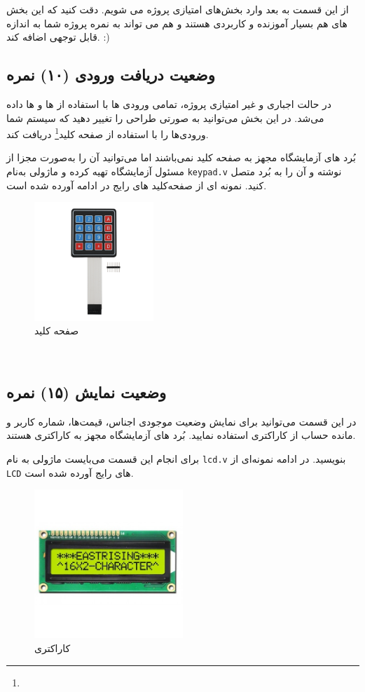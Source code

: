 \documentclass[]{article}
\begin{document}
از این قسمت به بعد وارد بخش‌های امتیازی پروژه می شویم. دقت کنید که این بخش های هم بسیار آموزنده و کاربردی هستند و هم می تواند به نمره پروژه شما به اندازه قابل توجهی اضافه کند. :)


\subsection*{{\titr وضعیت دریافت ورودی} (۱۰) نمره}
در حالت اجباری و غیر امتیازی پروژه، تمامی ورودی ها با استفاده از  ها و  ها داده می‌شد. در این بخش می‌توانید به صورتی طراحی را تغییر دهید که سیستم شما ورودی‌ها را با استفاده از صفحه کلید\footnote{} دریافت کند.

بُرد های آزمایشگاه مجهز به صفحه کلید نمی‌باشند اما می‌توانید آن را به‌صورت مجزا از مسئول آزمایشگاه تهیه کرده و ماژولی به‌نام \texttt{keypad.v} نوشته و آن را به بُرد متصل کنید. نمونه ای از صفحه‌کلید های رایج در ادامه آورده شده است.


\begin{figure}[h]
	\centering
	\includegraphics[width=0.4\textwidth]{images/keypad.png}
	\caption{صفحه کلید}
	\label{صفحه کلید}
\end{figure}




\newpage
\Large \textbf{\\
}




\subsection*{{\titr وضعیت نمایش} (۱۵) نمره}
در این قسمت می‌توانید برای نمایش وضعیت موجودی اجناس، قیمت‌ها، شماره کاربر و مانده حساب از  کاراکتری استفاده نمایید. بُرد های آزمایشگاه مجهز به  کاراکتری هستند. 

برای انجام این قسمت می‌بایست ماژولی به نام \texttt{lcd.v} بنویسید. در ادامه نمونه‌ای از \texttt{LCD} های رایج آورده شده است.


\begin{figure}[h]
	\centering
	\includegraphics[width=0.5\textwidth]{images/lcd.jpg}
	\caption{ کاراکتری}
	\label{LCD کاراکتری}
\end{figure}
\end{document}
